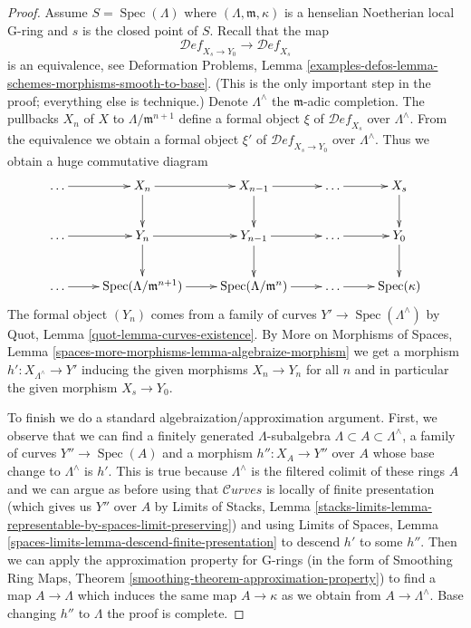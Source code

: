 \documentclass[10pt,a4paper]{amsart}
\theoremstyle{plain}
\theoremstyle{definition}
\theoremstyle{remark}
\numberwithin{equation}{subsection}
\def\Spec{\mathop{\mathrm{Spec}}}
\def\Curvesstack{\mathcal{C}\!\mathit{urves}}
\def\Deformationcategory{\mathcal{D}\!\mathit{ef}}
\begin{document}
\begin{proof}
\medskip\noindent
Assume $S = \Spec(\Lambda)$ where $(\Lambda, \mathfrak m, \kappa)$
is a henselian Noetherian local G-ring and $s$ is the closed point of $S$.
Recall that the map
$$
\Deformationcategory_{X_s \to Y_0} \to \Deformationcategory_{X_s}
$$
is an equivalence, see Deformation Problems, Lemma
\ref{examples-defos-lemma-schemes-morphisms-smooth-to-base}.
(This is the only important step in the proof; everything else
is technique.) Denote $\Lambda^\wedge$ the $\mathfrak m$-adic completion.
The pullbacks $X_n$ of $X$ to $\Lambda/\mathfrak m^{n + 1}$ define
a formal object $\xi$ of $\Deformationcategory_{X_s}$ over $\Lambda^\wedge$.
From the equivalence we obtain a formal object
$\xi'$ of $\Deformationcategory_{X_s \to Y_0}$ over $\Lambda^\wedge$.
Thus we obtain a huge commutative diagram
$$
\xymatrix{
\ldots \ar[r] &
X_n \ar[r] \ar[d] &
X_{n - 1} \ar[r] \ar[d] &
\ldots \ar[r] &
X_s \ar[d] \\
\ldots \ar[r] &
Y_n \ar[r] \ar[d] &
Y_{n - 1} \ar[r] \ar[d] &
\ldots \ar[r] &
Y_0 \ar[d] \\
\ldots \ar[r] &
\Spec(\Lambda/\mathfrak m^{n + 1}) \ar[r] &
\Spec(\Lambda/\mathfrak m^n) \ar[r] &
\ldots \ar[r] &
\Spec(\kappa)
}
$$
The formal object $(Y_n)$ comes from a family of curves
$Y' \to \Spec(\Lambda^\wedge)$ by
Quot, Lemma \ref{quot-lemma-curves-existence}.
By More on Morphisms of Spaces, Lemma
\ref{spaces-more-morphisms-lemma-algebraize-morphism}
we get a morphism $h' : X_{\Lambda^\wedge} \to Y'$ inducing
the given morphisms $X_n \to Y_n$ for all $n$
and in particular the given morphism $X_s \to Y_0$.

\medskip\noindent
To finish we do a standard algebraization/approximation argument.
First, we observe that we can find a finitely generated $\Lambda$-subalgebra
$\Lambda \subset A \subset \Lambda^\wedge$, a family of curves
$Y'' \to \Spec(A)$ and a morphism $h'' : X_A \to Y''$ over $A$
whose base change to $\Lambda^\wedge$ is $h'$.
This is true because $\Lambda^\wedge$ is the filtered colimit
of these rings $A$ and we can argue as before using
that $\Curvesstack$ is locally of finite presentation
(which gives us $Y''$ over $A$ by
Limits of Stacks, Lemma
\ref{stacks-limits-lemma-representable-by-spaces-limit-preserving})
and using 
Limits of Spaces, Lemma \ref{spaces-limits-lemma-descend-finite-presentation}
to descend $h'$ to some $h''$.
Then we can apply the approximation property for G-rings
(in the form of Smoothing Ring Maps, Theorem
\ref{smoothing-theorem-approximation-property})
to find a map $A \to \Lambda$ which induces the same map
$A \to \kappa$ as we obtain from $A \to \Lambda^\wedge$.
Base changing $h''$ to $\Lambda$ the proof is complete.
\end{proof}
\end{document}
